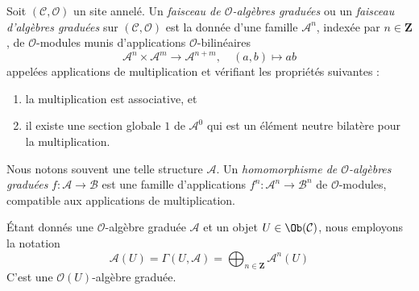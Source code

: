 \begin{definition}
\label{definition-ga}
Soit $(\mathcal{C}, \mathcal{O})$ un site annelé. Un
{\it faisceau de $\mathcal{O}$-algèbres graduées}
ou un {\it faisceau d'algèbres graduées} sur
$(\mathcal{C}, \mathcal{O})$ est la donnée d'une famille
$\mathcal{A}^n$, indexée par $n \in \mathbf{Z}$, de
$\mathcal{O}$-modules munis d'applications $\mathcal{O}$-bilinéaires
$$
\mathcal{A}^n \times \mathcal{A}^m \to \mathcal{A}^{n + m},\quad
(a, b) \longmapsto ab
$$
appelées applications de multiplication et vérifiant les propriétés suivantes :
\begin{enumerate}
\item la multiplication est associative, et
\item il existe une section globale $1$ de $\mathcal{A}^0$ qui est un
élément neutre bilatère pour la multiplication.
\end{enumerate}
Nous notons souvent une telle structure $\mathcal{A}$.
Un {\it homomorphisme de $\mathcal{O}$-algèbres graduées}
$f : \mathcal{A} \to \mathcal{B}$ est une famille d'applications
$f^n : \mathcal{A}^n \to \mathcal{B}^n$ de $\mathcal{O}$-modules,
compatible aux applications de multiplication.
\end{definition}

\noindent
Étant donnés une $\mathcal{O}$-algèbre graduée $\mathcal{A}$ et un objet
$U \in \Ob(\mathcal{C})$, nous employons la notation
$$
\mathcal{A}(U) =
\Gamma(U, \mathcal{A}) =
\bigoplus\nolimits_{n \in \mathbf{Z}} \mathcal{A}^n(U)
$$
C'est une $\mathcal{O}(U)$-algèbre graduée.

